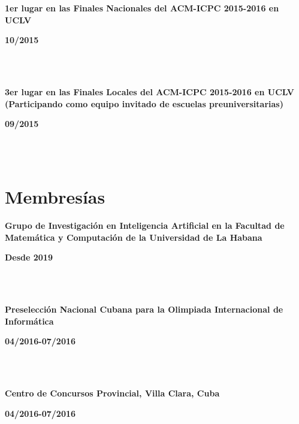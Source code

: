 \documentclass{article}
\begin{document}
\begin{minipage}{0.8\textwidth}
\parbox{0.8\linewidth}{\textbf{1er lugar en las Finales Nacionales del ACM-ICPC 2015-2016 en UCLV }} \hfill \textbf{10/2015}\\
\\
\end{minipage} \\
\begin{minipage}{0.8\textwidth}
\parbox{0.8\linewidth}{\textbf{3er lugar en las Finales Locales del ACM-ICPC 2015-2016 en UCLV (Participando como equipo invitado de escuelas preuniversitarias)}} \hfill \textbf{09/2015}\\
\\
\end{minipage}\\

\section*{Membresías}

\begin{minipage}{0.8\textwidth}
\parbox{0.8\linewidth}{\textbf{Grupo de Investigación en Inteligencia Artificial en la Facultad de Matemática y Computación de la Universidad de La Habana}} \hfill \textbf{Desde 2019}\\
\\
\end{minipage}\\
\begin{minipage}{0.8\textwidth}
\parbox{0.8\linewidth}{\textbf{Preselección Nacional Cubana para la Olimpiada Internacional de Informática}} \hfill \textbf{04/2016-07/2016}\\
\\
\end{minipage}\\
\begin{minipage}{0.8\textwidth}
\parbox{0.8\linewidth}{\textbf{Centro de Concursos Provincial, Villa Clara, Cuba}} \hfill \textbf{04/2016-07/2016}\\
\\
\end{minipage}\\

\newpage
\end{document}
